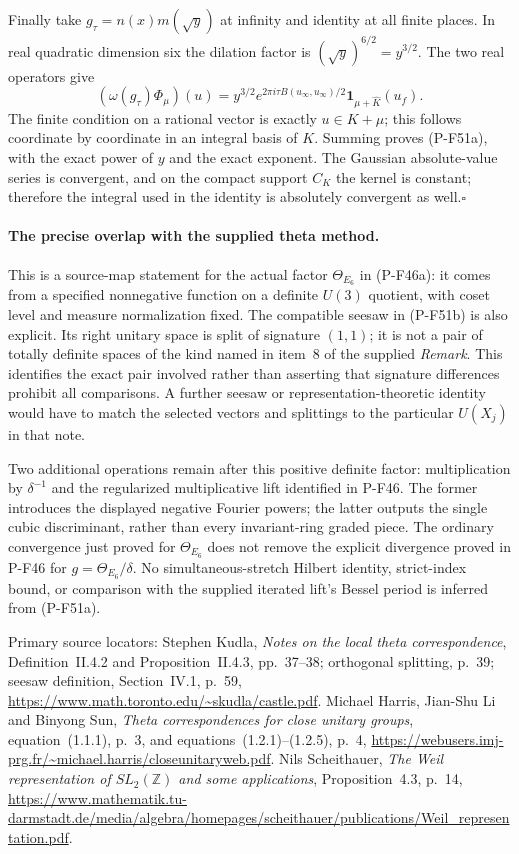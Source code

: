 \documentclass[11pt,a4paper]{article}
\begin{document}
Finally take $g_\tau=n(x)m(\sqrt y)$ at infinity and
identity at all finite places. In real quadratic
dimension six the dilation factor is
$(\sqrt y)^{6/2}=y^{3/2}$. The two real operators give
\[
 (\omega(g_\tau)\Phi_\mu)(u)
     =y^{3/2}e^{2\pi i\tau B(u_\infty,u_\infty)/2}
                            \mathbf1_{\mu+\widehat K}(u_f).
\]
The finite condition on a rational vector is exactly
$u\in K+\mu$; this follows coordinate by coordinate in
an integral basis of $K$. Summing proves (P-F51a),
with the exact power of $y$ and the exact exponent.
The Gaussian absolute-value series is convergent,
and on the compact support $C_K$ the kernel is constant;
therefore the integral used in the identity is absolutely
convergent as well.\hfill$\square$

\paragraph{The precise overlap with the supplied theta method.}
This is a source-map statement for the actual factor
$\Theta_{E_6}$ in (P-F46a): it comes from a specified
nonnegative function on a definite $U(3)$ quotient,
with coset level and measure normalization fixed.
The compatible seesaw in (P-F51b) is also explicit.
Its right unitary space is split of signature $(1,1)$;
it is not a pair of totally definite spaces of the
kind named in item~8 of the supplied \emph{Remark}.
This identifies the exact pair involved rather than
asserting that signature differences prohibit all
comparisons. A further seesaw or representation-theoretic
identity would have to match the selected vectors and
splittings to the particular $U(X_j)$ in that note.

Two additional operations remain after this positive
definite factor: multiplication by $\delta^{-1}$ and
the regularized multiplicative lift identified in
P-F46. The former introduces the displayed negative
Fourier powers; the latter outputs the single cubic
discriminant, rather than every invariant-ring graded
piece. The ordinary convergence just proved for
$\Theta_{E_6}$ does not remove the explicit divergence
proved in P-F46 for $g=\Theta_{E_6}/\delta$.
No simultaneous-stretch Hilbert identity, strict-index
bound, or comparison with the supplied iterated lift's
Bessel period is inferred from (P-F51a).

Primary source locators: Stephen Kudla,
\emph{Notes on the local theta correspondence},
Definition~II.4.2 and Proposition~II.4.3, pp.~37--38;
orthogonal splitting, p.~39; seesaw definition,
Section~IV.1, p.~59,
\url{https://www.math.toronto.edu/~skudla/castle.pdf}.
Michael Harris, Jian-Shu Li and Binyong Sun,
\emph{Theta correspondences for close unitary groups},
equation~(1.1.1), p.~3, and equations~(1.2.1)--(1.2.5),
p.~4,
\url{https://webusers.imj-prg.fr/~michael.harris/closeunitaryweb.pdf}.
Nils Scheithauer, \emph{The Weil representation of $SL_2(\mathbb Z)$
and some applications}, Proposition~4.3, p.~14,
\url{https://www.mathematik.tu-darmstadt.de/media/algebra/homepages/scheithauer/publications/Weil_representation.pdf}.
\end{document}
